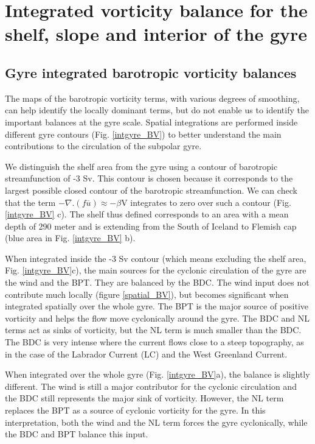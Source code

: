 \documentclass{ametsoc}
\begin{document}
\section{Integrated vorticity balance for the shelf, slope and interior of the gyre}

\subsection{Gyre integrated barotropic vorticity balances}

The maps of the barotropic vorticity terms, with various degrees of smoothing, can help identify the locally dominant terms, but do not enable us to identify the important balances at the gyre scale. Spatial integrations are performed inside different gyre contours (Fig. \ref{intgyre_BV}) to better understand the main contributions to the circulation of the subpolar gyre. 

We distinguish the shelf area from the gyre using a contour of barotropic streamfunction of -3 Sv. This contour is chosen because it corresponds to the largest possible closed contour of the barotropic streamfunction. We can check that the term $-\nabla.(f\overline{u}) \approx -\beta$V integrates to zero over such a contour (Fig. \ref{intgyre_BV} c). The shelf thus defined corresponds to an area with a mean depth of 290 meter and is extending from the South of Iceland to Flemish cap (blue area in Fig. \ref{intgyre_BV} b).

When integrated inside the -3 Sv contour (which means excluding the shelf area, Fig. \ref{intgyre_BV}c), the main sources for the cyclonic circulation of the gyre are the wind and the BPT. They are balanced by the BDC. The wind input does not contribute much locally (figure \ref{spatial_BV}), but becomes significant when integrated spatially over the whole gyre. The BPT is the major source of positive vorticity and helps the flow move cyclonically around the gyre. The BDC and NL terms act as sinks of vorticity, but the NL term is much smaller than the BDC. The BDC is very intense where the current flows close to a steep topography, as in the case of the Labrador Current (LC) and the West Greenland Current. 

When integrated over the whole gyre (Fig. \ref{intgyre_BV}a), the balance is slightly different. The wind is still a major contributor for the cyclonic circulation and the BDC still represents the major sink of vorticity. However, the NL term replaces the BPT as a source of cyclonic vorticity for the gyre. In this interpretation, both the wind and the NL term forces the gyre cyclonically, while the BDC and BPT balance this input. 
\end{document}
